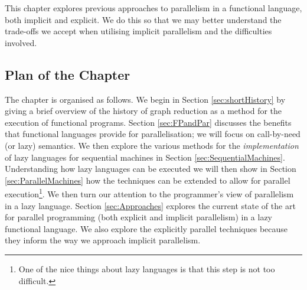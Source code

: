 This chapter explores previous approaches to parallelism in a
functional language, both implicit and explicit. We do this so that
we may better understand the trade-offs we accept when utilising
implicit parallelism and the difficulties involved.

\subsection*{Plan of the Chapter}

The chapter is organised as follows. We begin in Section \ref{sec:shortHistory}
by giving a brief overview of the history of graph reduction as a method for
the execution of functional programs. Section \ref{sec:FPandPar} discusses the
benefits that functional languages provide for parallelisation; we will focus
on call-by-need (or lazy) semantics. We then explore the various methods for
the \emph{implementation} of lazy languages for sequential machines in Section
\ref{sec:SequentialMachines}. Understanding how lazy languages can be executed
we will then show in Section \ref{sec:ParallelMachines} how the techniques can
be extended to allow for parallel execution\footnote{One of the nice things
about lazy languages is that this step is not too difficult.}. We then turn our
attention to the programmer's view of parallelism in a lazy language. Section
\ref{sec:Approaches} explores the current state of the art for parallel
programming (both explicit and implicit parallelism) in a lazy functional
language. We also explore the explicitly parallel techniques because they
inform the way we approach implicit parallelism.

